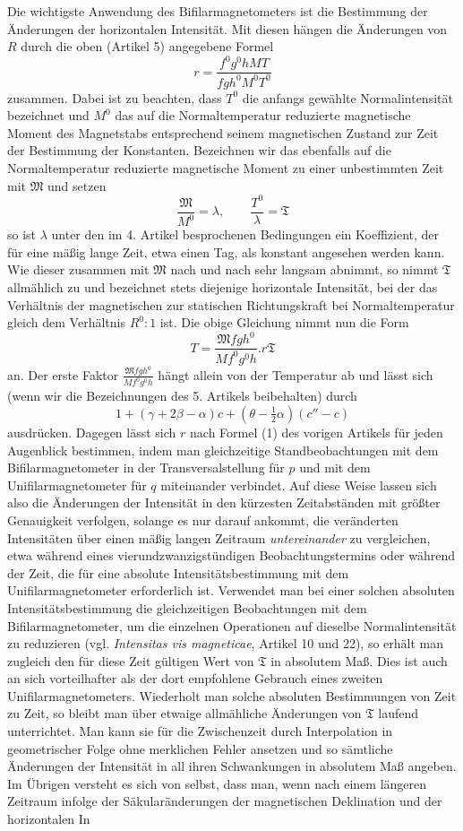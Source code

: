 Die wichtigste Anwendung des Bifilarmagnetometers ist die Bestimmung der Änderungen der horizontalen Intensität. Mit diesen hängen die Änderungen von $R$ durch die oben (Artikel 5) angegebene Formel
\[
r=\frac{f^0g^0hMT}{fgh^0M^0T^0}
\]
zusammen. Dabei ist zu beachten, dass $T^0$ die anfangs gewählte Normalintensität bezeichnet und $M^0$ das auf die Normaltemperatur reduzierte magnetische Moment des Magnetstabs entsprechend seinem magnetischen Zustand zur Zeit der Bestimmung der Konstanten. Bezeichnen wir das ebenfalls auf die Normaltemperatur reduzierte magnetische Moment zu einer unbestimmten Zeit mit $\mathfrak{M}$ und setzen
\[
\frac{\mathfrak{M}}{M^0}=\lambda,\qquad\frac{T^0}{\lambda}=\mathfrak{T}
\]
so ist $\lambda$ unter den im 4. Artikel besprochenen Bedingungen ein Koeffizient, der für eine mäßig lange
Zeit, etwa einen Tag, als konstant angesehen werden kann. Wie dieser zusammen mit $\mathfrak{M}$ nach und nach sehr langsam abnimmt, so nimmt $\mathfrak{T}$ allmählich zu und bezeichnet stets diejenige horizontale Intensität, bei der das Verhältnis der magnetischen zur statischen Richtungskraft bei Normaltemperatur gleich dem Verhältnis $R^0:1$ ist. Die obige Gleichung nimmt nun die Form
\[
T=\frac{\mathfrak{M}fgh^0}{Mf^0g^0h}.r\mathfrak{T}
\]
an. Der erste Faktor $\frac{\mathfrak{M}fgh^0}{Mf^0g^0h}$ hängt allein von der Temperatur ab und lässt sich (wenn wir die Bezeichnungen des 5. Artikels beibehalten) durch
\[
1+(\gamma+2\beta-\alpha)c+(\theta-\tfrac12\alpha)(c''-c)
\]
ausdrücken. Dagegen lässt sich $r$ nach Formel (1) des vorigen Artikels für jeden Augenblick bestimmen, indem man gleichzeitige Standbeobachtungen mit dem Bifilarmagnetometer in der Transversalstellung für $p$ und mit dem Unifilarmagnetometer für $q$ miteinander verbindet. Auf diese Weise lassen sich also die Änderungen der Intensität in den kürzesten Zeitabständen mit größter Genauigkeit verfolgen, solange es nur darauf ankommt, die veränderten Intensitäten über einen mäßig langen Zeitraum \textit{untereinander} zu vergleichen, etwa während eines vierundzwanzigstündigen Beobachtungstermins oder während der Zeit, die für eine absolute Intensitätsbestimmung mit dem Unifilarmagnetometer erforderlich ist. Verwendet man bei einer solchen absoluten Intensitätsbestimmung die gleichzeitigen Beobachtungen mit dem Bifilarmagnetometer, um die einzelnen Operationen auf dieselbe Normalintensität zu reduzieren (vgl. \textit{Intensitas vis magneticae}, Artikel 10 und 22), so erhält man zugleich den für diese Zeit gültigen Wert von $\mathfrak{T}$ in absolutem Maß. Dies ist auch an sich vorteilhafter als der dort empfohlene Gebrauch eines zweiten Unifilarmagnetometers. Wiederholt man solche absoluten Bestimmungen von Zeit zu Zeit, so bleibt man über etwaige allmähliche Änderungen von $\mathfrak{T}$ laufend unterrichtet. Man kann sie für die Zwischenzeit durch Interpolation in geometrischer Folge ohne merklichen Fehler ansetzen und so sämtliche Änderungen der Intensität in all ihren Schwankungen in absolutem Maß angeben. Im Übrigen versteht es sich von selbst, dass man, wenn nach einem längeren Zeitraum infolge der Säkularänderungen der magnetischen Deklination und der horizontalen In%
